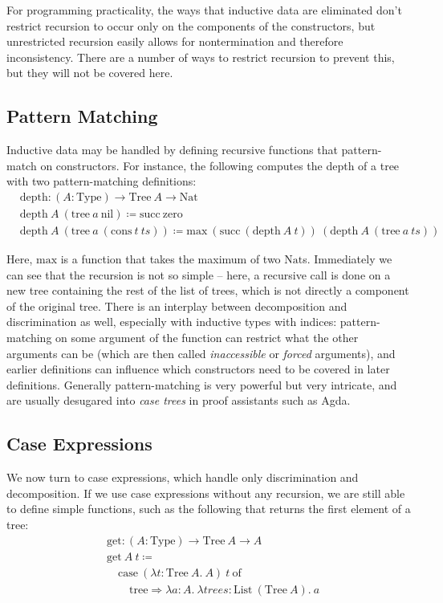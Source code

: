\documentclass{report}
\newcommand{\Nat}{\const{Nat}}
\newcommand{\zero}{\const{zero}}
\renewcommand{\succ}{\const{succ}}
\newcommand{\nil}{\const{nil}}
\newcommand{\cons}{\const{cons}}
\newcommand{\Tree}{\const{Tree}}
\newcommand{\tree}{\const{tree}}
\newcommand{\const}[1]{\text{#1}}
\newcommand{\Type}{\const{Type}}
\newcommand{\case}{\const{case}}
\newcommand{\of}{\const{of}}
\begin{document}
For programming practicality, the ways that inductive data are eliminated don't restrict recursion to occur only on the components of the constructors, but unrestricted recursion easily allows for nontermination and therefore inconsistency. There are a number of ways to restrict recursion to prevent this, but they will not be covered here.

\subsection{Pattern Matching}

Inductive data may be handled by defining recursive functions that pattern-match on constructors. For instance, the following computes the depth of a tree with two pattern-matching definitions:
%
\begin{align*}
    &\const{depth} : (A : \Type) \to \Tree ~ A \to \Nat \\
    &\const{depth} ~ A ~ (\tree ~ a ~ \nil) \coloneqq \succ ~ \zero \\
    &\const{depth} ~ A ~ (\tree ~ a ~ (\cons ~ t ~ ts)) \coloneqq \const{max} ~ (\succ ~ (\const{depth} ~ A ~ t)) ~ (\const{depth} ~ A ~ (\tree ~ a ~ ts))
\end{align*}

Here, $\const{max}$ is a function that takes the maximum of two $\Nat$s. Immediately we can see that the recursion is not so simple -- here, a recursive call is done on a new tree containing the rest of the list of trees, which is not directly a component of the original tree. There is an interplay between decomposition and discrimination as well, especially with inductive types with indices: pattern-matching on some argument of the function can restrict what the other arguments can be (which are then called \emph{inaccessible} or \emph{forced} arguments), and earlier definitions can influence which constructors need to be covered in later definitions. Generally pattern-matching is very powerful but very intricate, and are usually desugared into \emph{case trees} in proof assistants such as Agda.

\subsection{Case Expressions}

We now turn to case expressions, which handle only discrimination and decomposition. If we use case expressions without any recursion, we are still able to define simple functions, such as the following that returns the first element of a tree:
%
\begin{align*}
    &\const{get} : (A : \Type) \to \Tree ~ A \to A \\
    &\const{get} ~ A ~ t \coloneqq \\
    &\quad\case ~ (\lambda t: \Tree ~ A . ~ A) ~ t ~ \of \\
    &\qquad\tree \Rightarrow \lambda a: A. ~ \lambda trees: \const{List} ~ (\Tree ~ A). ~ a
\end{align*}
\end{document}
